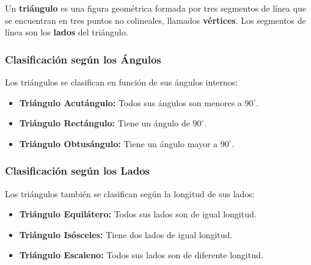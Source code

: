 Un \textbf{triángulo} es una figura geométrica formada por tres segmentos de línea que se encuentran en tres puntos no colineales, llamados \textbf{vértices}. Los segmentos de línea son los \textbf{lados} del triángulo.

\subsubsection{Clasificación según los Ángulos}

Los triángulos se clasifican en función de sus ángulos internos:

\begin{itemize}
    \item \textbf{Triángulo Acutángulo:} Todos sus ángulos son menores a \( 90^\circ \).
    \item \textbf{Triángulo Rectángulo:} Tiene un ángulo de \( 90^\circ \).
    \item \textbf{Triángulo Obtusángulo:} Tiene un ángulo mayor a \( 90^\circ \).
\end{itemize}


\subsubsection{Clasificación según los Lados}

Los triángulos también se clasifican según la longitud de sus lados:

\begin{itemize}
    \item \textbf{Triángulo Equilátero:} Todos sus lados son de igual longitud.
    \item \textbf{Triángulo Isósceles:} Tiene dos lados de igual longitud.
    \item \textbf{Triángulo Escaleno:} Todos sus lados son de diferente longitud.
\end{itemize}


